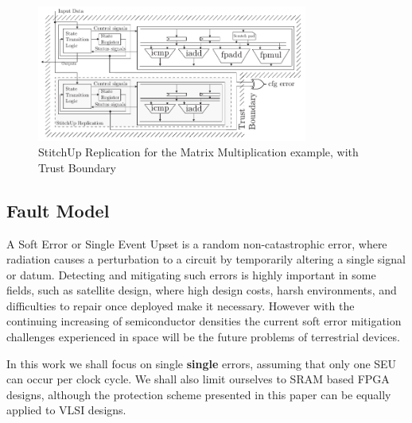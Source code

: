 \begin{figure}[h]
\centering
\includegraphics[width=3.5in]{./imgs/StitchUpReplication.pdf}
\caption{StitchUp Replication for the Matrix Multiplication example, with Trust Boundary}
\label{fig:HLSArch}
\end{figure}

\subsection{Fault Model}
A Soft Error or Single Event Upset is a random non-catastrophic error, where radiation causes
a perturbation to a circuit by temporarily altering a single signal or datum. 
Detecting and mitigating such errors is highly important in some fields, such as satellite design, 
where high design costs, harsh environments, and difficulties to repair once deployed make it necessary. 
However with the continuing increasing of semiconductor densities the current soft error mitigation
challenges experienced in space will be the future problems of terrestrial devices\cite{normand1996single}\cite{henkel2013reliable}.

In this work we shall focus on single \textbf{single} errors, assuming that only one SEU
can occur per clock cycle.
We shall also limit ourselves to SRAM based FPGA designs, although the protection scheme 
presented in this paper can be equally applied to VLSI designs.

